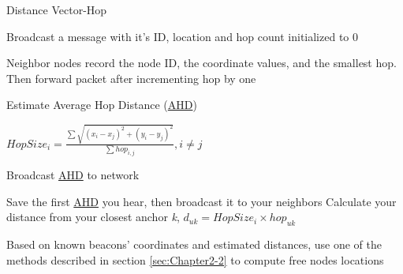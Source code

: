 \begin{algorithm}[H]
	\caption[Distance Vector-Hop]{Distance Vector-Hop \cite{dv-hop-algo} \cite{dv-hop-algo2} \cite{dv-hop-algo3}}\label{alg:DV-Hop}
	\begin{algorithmic}[1]
			
				\State Broadcast a message with it's ID, location and hop count initialized to 0
      		\EndFor 
			
				\State Neighbor nodes record the node ID, the coordinate values, and  the smallest  
				\newline\hspace*{1.5em}hop. Then forward packet after incrementing hop by one
      		\EndFor

				\State Estimate Average Hop Distance (\hyperref[abbr:AHD]{AHD}) \par
				\hspace*{7em}$HopSize_i = \frac{\sum{\sqrt{(x_i-x_j)^2+(y_i-y_j)^2}}}{\sum{hop_{i,j}}}, i\neq j$

				\State Broadcast \hyperref[abbr:AHD]{AHD} to network
			\EndFor
			
				\State Save the first \hyperref[abbr:AHD]{AHD} you hear, then broadcast it to your neighbors 
				\State Calculate your distance from your closest anchor \emph{k},
				$d_{uk} = HopSize_i \times hop_{uk}$
			\EndFor

			\State Based on known beacons' coordinates and estimated distances, use one of the methods described in 
			section \ref{sec:Chapter2-2} to compute free nodes locations
	\end{algorithmic}
\end{algorithm}



